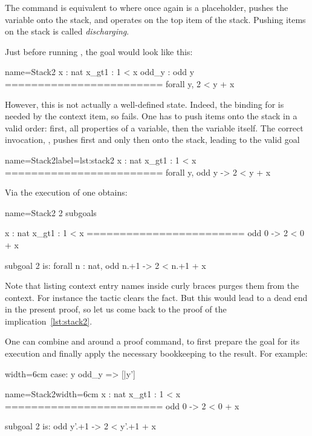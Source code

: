 The command  is equivalent to
 where  once again is a placeholder,
 pushes the  variable onto the stack, and 
operates on the top item of the stack.
Pushing items on the stack is called \emph{discharging}.

Just before running , the goal would look like this:

\begin{coqout}{name=Stack2}{}
 x : nat
 x_gt1 : 1 < x
 odd_y : odd y
 ========================
 forall y, 2 < y + x
\end{coqout}

However, this is not actually a well-defined state.
Indeed, the binding for  is needed by the 
context item, so  fails.  One has to push items onto the
stack in a valid order: first, all properties of a variable, then the
variable itself.  The correct invocation,
, pushes first  and only then  onto
the stack, leading to the valid goal

\begin{coqout}{name=Stack2}{label=lst:stack2}
 x : nat
 x_gt1 : 1 < x
 ========================
 forall y, odd y -> 2 < y + x
\end{coqout}

Via the execution of  one obtains:

\begin{coqout}{name=Stack2}{}
2 subgoals

  x : nat
  x_gt1 : 1 < x
  ========================
   odd 0 -> 2 < 0 + x

subgoal 2 is:
 forall n : nat, odd n.+1 -> 2 < n.+1 + x
\end{coqout}

Note that listing context entry names inside curly braces purges them
from the context. For instance the tactic 
clears the  fact. But this would lead to a dead end in the
present proof, so let us come back to the proof of the
implication~\ref{lst:stack2}.


One can combine \C{:} and \C{=>} around a proof command, to first prepare the
goal for its execution and finally apply the necessary bookkeeping to the
result.  For example:

\begin{coq-left}{}{width=6cm}
case: y odd_y => [|y']
$~$
$~$
$~$
$~$
$~$
$~$
\end{coq-left}
\begin{coqout-right}{name=Stack2}{width=6cm}
  x : nat
  x_gt1 : 1 < x
  ========================
   odd 0 -> 2 < 0 + x

subgoal 2 is:
 odd y'.+1 -> 2 < y'.+1 + x
\end{coqout-right}

